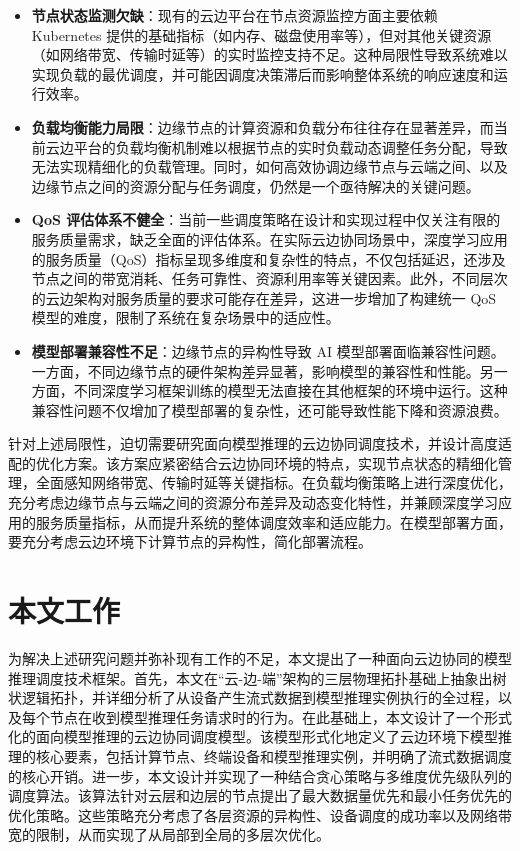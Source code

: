 \begin{itemize} 
    \item \textbf{节点状态监测欠缺}：现有的云边平台在节点资源监控方面主要依赖 Kubernetes 提供的基础指标（如内存、磁盘使用率等），但对其他关键资源（如网络带宽、传输时延等）的实时监控支持不足。这种局限性导致系统难以实现负载的最优调度，并可能因调度决策滞后而影响整体系统的响应速度和运行效率。
    \item \textbf{负载均衡能力局限}：边缘节点的计算资源和负载分布往往存在显著差异，而当前云边平台的负载均衡机制难以根据节点的实时负载动态调整任务分配，导致无法实现精细化的负载管理。同时，如何高效协调边缘节点与云端之间、以及边缘节点之间的资源分配与任务调度，仍然是一个亟待解决的关键问题。
    \item \textbf{QoS 评估体系不健全}：当前一些调度策略在设计和实现过程中仅关注有限的服务质量需求，缺乏全面的评估体系。在实际云边协同场景中，深度学习应用的服务质量（QoS）指标呈现多维度和复杂性的特点，不仅包括延迟，还涉及节点之间的带宽消耗、任务可靠性、资源利用率等关键因素。此外，不同层次的云边架构对服务质量的要求可能存在差异，这进一步增加了构建统一 QoS 模型的难度，限制了系统在复杂场景中的适应性。
    \item \textbf{模型部署兼容性不足}：边缘节点的异构性导致 AI 模型部署面临兼容性问题。一方面，不同边缘节点的硬件架构差异显著，影响模型的兼容性和性能。另一方面，不同深度学习框架训练的模型无法直接在其他框架的环境中运行。这种兼容性问题不仅增加了模型部署的复杂性，还可能导致性能下降和资源浪费。
\end{itemize}

针对上述局限性，迫切需要研究面向模型推理的云边协同调度技术，并设计高度适配的优化方案。该方案应紧密结合云边协同环境的特点，实现节点状态的精细化管理，全面感知网络带宽、传输时延等关键指标。在负载均衡策略上进行深度优化，充分考虑边缘节点与云端之间的资源分布差异及动态变化特性，并兼顾深度学习应用的服务质量指标，从而提升系统的整体调度效率和适应能力。在模型部署方面，要充分考虑云边环境下计算节点的异构性，简化部署流程。

\section{本文工作}

为解决上述研究问题并弥补现有工作的不足，本文提出了一种面向云边协同的模型推理调度技术框架。首先，本文在“云-边-端”架构的三层物理拓扑基础上抽象出树状逻辑拓扑，并详细分析了从设备产生流式数据到模型推理实例执行的全过程，以及每个节点在收到模型推理任务请求时的行为。在此基础上，本文设计了一个形式化的面向模型推理的云边协同调度模型。该模型形式化地定义了云边环境下模型推理的核心要素，包括计算节点、终端设备和模型推理实例，并明确了流式数据调度的核心开销。进一步，本文设计并实现了一种结合贪心策略与多维度优先级队列的调度算法。该算法针对云层和边层的节点提出了最大数据量优先和最小任务优先的优化策略。这些策略充分考虑了各层资源的异构性、设备调度的成功率以及网络带宽的限制，从而实现了从局部到全局的多层次优化。

